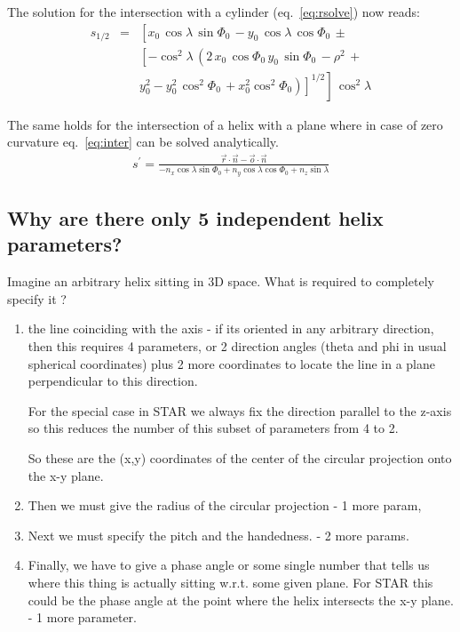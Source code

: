 \documentclass[twoside]{article}
\begin{document}
The solution for the intersection with a cylinder (eq.~\ref{eq:rsolve}) now reads:
\begin{eqnarray}
s_{1/2}   & = & \left[x_0\,\cos\lambda\,\sin\Phi_0\,- y_0\,\cos\lambda\,\cos\Phi_0 \, \pm  \right. \\
   & & \left.
\left[-\cos^2\lambda\,\left(2\,x_0\,\cos\Phi_0\, y_0
\,\sin\Phi_0\,-\rho^2\, + \right. \right. \right.  \\
& & \left. \left.  \left.
y_0^2-y_0^2 \,\cos^2\Phi_0\,
+ x_0^2  \cos^2\Phi_0 \right )\right]^{1/2} \right]\, \cos^2\lambda 
\end{eqnarray}


The same holds for the intersection of a helix with a plane where in case
of zero curvature eq.~\ref{eq:inter} can be solved analytically.
\begin{eqnarray}
s^{\prime} = \frac{ \vec{r} \cdot \vec{n} - \vec{o} \cdot \vec{n} }
                  {- n_x \cos \lambda \sin \Phi_0
                   + n_y \cos \lambda \cos \Phi_0
                   + n_z \sin \lambda}
\end{eqnarray}

\subsection{Why are there only 5 independent helix parameters?}
\label{sec:hparam}
    
    Imagine an arbitrary helix sitting in 3D space.  What is required
    to completely specify it ?
    \begin{enumerate}
    \item the line coinciding with the axis - if its oriented in any arbitrary
        direction, then this requires 4 parameters, or 2 direction angles
        (theta and phi in usual spherical coordinates) plus 2 more coordinates
        to locate the line in a plane perpendicular to this direction.
       
        For the special case in STAR we always fix the direction 
        parallel to the z-axis so this reduces the number of this subset
        of parameters from 4 to 2.

        So these are the (x,y) coordinates of the center of the circular
        projection onto the x-y plane.

    \item Then we must give the radius of the circular projection - 1 more param,
                 
    \item Next we must specify the pitch and the handedness. - 2 more params.

    \item  Finally, we have to give a phase angle or some single number that
        tells us where this thing is actually sitting w.r.t. some given
        plane.  For STAR this could be the phase angle at the point where
        the helix intersects the x-y plane. - 1 more parameter.
        
    \end{enumerate}
\end{document}
